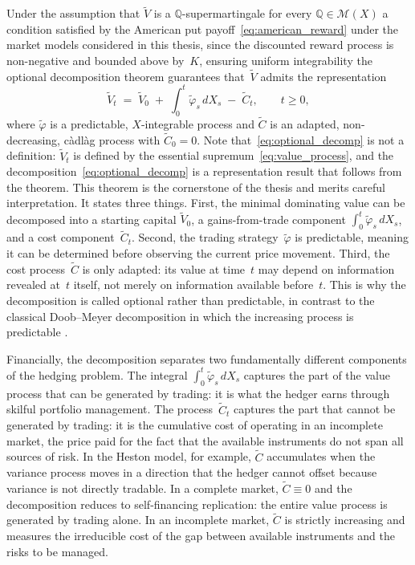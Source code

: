 Under the assumption that $\tilde{V}$ is a $\mathbb{Q}$-supermartingale
for every $\mathbb{Q} \in \mathcal{M}(X)$ a condition satisfied by
the American put payoff~\eqref{eq:american_reward} under the market models
considered in this thesis, since the discounted reward process is
non-negative and bounded above by~$K$, ensuring uniform integrability
the optional decomposition theorem \citep{Kramkov1996} guarantees
that~$\tilde{V}$ admits the representation
\begin{equation}
\label{eq:optional_decomp}
\tilde{V}_t
\;=\; \tilde{V}_0
\;+\; \int_0^t \tilde{\varphi}_s \, dX_s
\;-\; \tilde{C}_t,
\qquad t \ge 0,
\end{equation}
where $\tilde{\varphi}$ is a predictable, $X$-integrable process and
$\tilde{C}$ is an adapted, non-decreasing, c\`{a}dl\`{a}g process with
$\tilde{C}_0 = 0$.  Note that~\eqref{eq:optional_decomp} is not a
definition: $\tilde{V}_t$ is defined by the essential
supremum~\eqref{eq:value_process}, and the
decomposition~\eqref{eq:optional_decomp} is a representation result that
follows from the theorem.  This theorem is the cornerstone of the thesis
and merits careful interpretation.  It states three things.  First, the
minimal dominating value can be decomposed into a starting capital
$\tilde{V}_0$, a gains-from-trade component
$\int_0^t \tilde{\varphi}_s \, dX_s$, and a cost
component~$\tilde{C}_t$.  Second, the trading
strategy~$\tilde{\varphi}$ is predictable, meaning it can be determined
before observing the current price movement.  Third, the cost
process~$\tilde{C}$ is only adapted: its value at time~$t$ may depend on
information revealed at~$t$ itself, not merely on information available
before~$t$.  This is why the decomposition is called optional rather than
predictable, in contrast to the classical Doob--Meyer decomposition in
which the increasing process is predictable \citep{KaratzasShreve1991}.

Financially, the decomposition separates two fundamentally different
components of the hedging problem.  The integral
$\int_0^t \tilde{\varphi}_s \, dX_s$ captures the part of the value
process that can be generated by trading: it is what the hedger earns
through skilful portfolio management.  The process~$\tilde{C}_t$ captures
the part that cannot be generated by trading: it is the cumulative cost of
operating in an incomplete market, the price paid for the fact that the
available instruments do not span all sources of risk.  In the Heston
model, for example, $\tilde{C}$ accumulates when the variance process
moves in a direction that the hedger cannot offset because variance is not
directly tradable.  In a complete market, $\tilde{C} \equiv 0$ and the
decomposition reduces to self-financing replication: the entire value
process is generated by trading alone.  In an incomplete market,
$\tilde{C}$ is strictly increasing and measures the irreducible cost of
the gap between available instruments and the risks to be managed.

